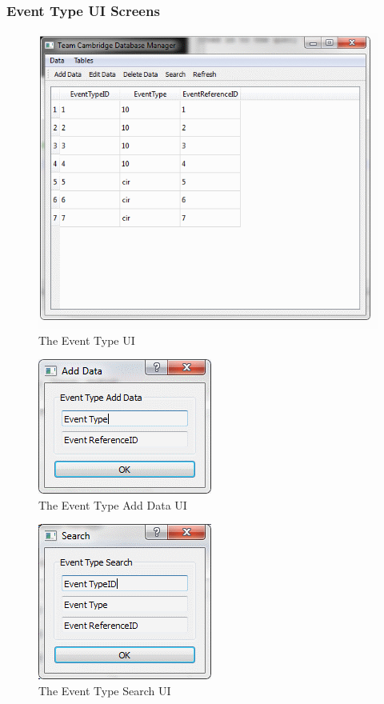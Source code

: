 \clearpage
\subsubsection{Event Type UI Screens}

\begin{figure}[H]
\includegraphics{./Maintenance/UI/EventType.png}
\caption{The Event Type UI} \label{fig:EventType_UI}
\end{figure}

\begin{figure}[H]
\includegraphics{./Maintenance/UI/EventTypeAD.png}
\caption{The Event Type Add Data UI} \label{fig:EventTypeAD_UI}
\end{figure}

\begin{figure}[H]
\includegraphics{./Maintenance/UI/EventTypeSearch.png}
\caption{The Event Type Search UI} \label{fig:EventTypeSearch_UI}
\end{figure}

